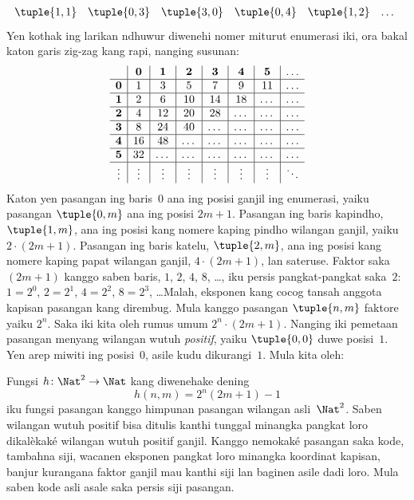 \documentclass[../../../include/open-logic-section]{subfiles}
\begin{document}
\begin{explain}
\[\begin{array}{@{}cc c c c c c c c c c@{}}
\tuple{1,1} & \tuple{0,3} & \tuple{3,0}  & \tuple{0,4} &  \tuple{1,2} & \dots \\
\end{array}
\]
Yen kothak ing larikan ndhuwur diwenehi nomer miturut enumerasi iki,
ora bakal katon garis zig-zag kang rapi, nanging susunan:
\[
\begin{array}{ c | c | c | c | c | c | c | c }
& \mathbf 0 & \mathbf 1 & \mathbf 2 & \mathbf 3 & \mathbf 4 & \mathbf 5 & \dots \\
\hline
\mathbf 0 & 1 & 3 & 5 & 7 & 9 & 11 & \dots \\
\hline
\mathbf 1 & 2 & 6 & 10 & 14 & 18 & \dots & \dots \\
\hline
\mathbf 2 & 4 & 12 & 20 & 28 & \dots & \dots & \dots \\
\hline
\mathbf 3 & 8 & 24 & 40 & \dots & \dots & \dots & \dots \\
\hline
\mathbf 4 & 16 & 48 & \dots & \dots & \dots & \dots & \dots \\
\hline
\mathbf 5 & 32 & \dots & \dots & \dots & \dots & \dots & \dots \\
\hline
\vdots & \vdots & \vdots & \vdots & \vdots & \vdots & \vdots & \ddots\\
\end{array}
\]
Katon yen pasangan ing baris~$0$ ana ing posisi ganjil
ing enumerasi, yaiku pasangan $\tuple{0,m}$ ana ing posisi $2m+1$.
Pasangan ing baris kapindho, $\tuple{1,m}$, ana ing posisi kang nomere
kaping pindho wilangan ganjil, yaiku $2 \cdot (2m+1)$.
Pasangan ing baris katelu, $\tuple{2,m}$, ana ing posisi kang nomere
kaping papat wilangan ganjil, $4 \cdot (2m+1)$, lan sateruse.
Faktor saka $(2m+1)$ kanggo saben baris, $1$, $2$, $4$, $8$, \dots,
iku persis pangkat-pangkat saka~$2$:
$1= 2^0$, $2 = 2^1$, $4 = 2^2$, $8 = 2^3$, \dots\@ Malah,
eksponen kang cocog tansah anggota kapisan pasangan kang dirembug.
Mula kanggo pasangan $\tuple{n,m}$ faktore yaiku $2^n$.
Saka iki kita oleh rumus umum $2^n \cdot (2m+1)$. Nanging iki
pemetaan pasangan menyang wilangan wutuh \emph{positif}, yaiku $\tuple{0,0}$
duwe posisi~$1$. Yen arep miwiti ing posisi~$0$, asile kudu dikurangi~$1$.
Mula kita oleh:
\end{explain}

\begin{ex}
Fungsi $h\colon \Nat^2 \to \Nat$ kang diwenehake dening
\[
h(n,m) = 2^n (2m+1) - 1
\]
iku fungsi pasangan kanggo himpunan pasangan wilangan asli~$\Nat^2$.
Saben wilangan wutuh positif bisa ditulis kanthi tunggal minangka pangkat loro
dikalèkaké wilangan wutuh positif ganjil. Kanggo nemokaké pasangan saka
kode, tambahna siji, wacanen eksponen pangkat loro minangka koordinat
kapisan, banjur kurangana faktor ganjil mau kanthi siji lan baginen asile dadi loro.
Mula saben kode asli asale saka persis siji pasangan.
\end{ex}
\end{document}
